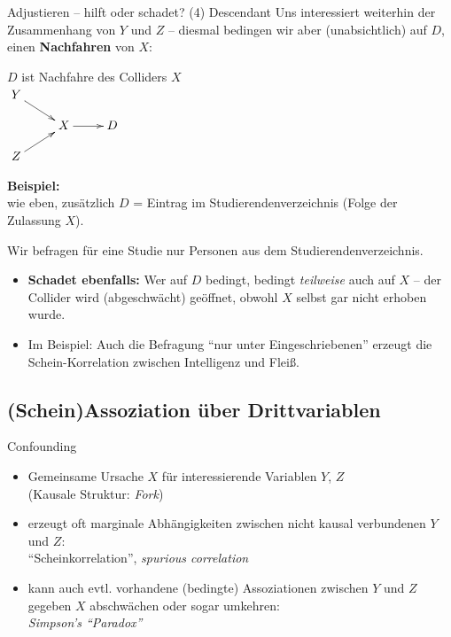 \documentclass[
  10pt,
  ignorenonframetext,
]{beamer}
\providecommand{\tightlist}{%
  \setlength{\itemsep}{0pt}\setlength{\parskip}{0pt}}
\begin{document}
\begin{frame}{Adjustieren -- hilft oder schadet? (4) Descendant}
\protect\hypertarget{adjustieren-hilft-oder-schadet-4-descendant}{}
Uns interessiert weiterhin der Zusammenhang von \(Y\) und \(Z\) --
diesmal bedingen wir aber (unabsichtlich) auf \(D\), einen
\textbf{Nachfahren} von \(X\):

\columnsbegin
\column{4.2cm}
\begin{center}
$D$ ist Nachfahre des Colliders $X$\\[.3em]
$\xymatrix@R-1pc{
 Y \ar[dr] & \\
  & X \ar[r] & D \\
 Z \ar[ur] &
}$
\end{center}
\column{6.5cm}
\small

\textbf{Beispiel:}\\
wie eben, zusätzlich \(D\) = Eintrag im Studierendenverzeichnis (Folge
der Zulassung \(X\)).

Wir befragen für eine Studie nur Personen aus dem
Studierendenverzeichnis. \columnsend

\begin{itemize}[<+->]
\tightlist
\item
  \textbf{Schadet ebenfalls:} Wer auf \(D\) bedingt, bedingt
  \emph{teilweise} auch auf \(X\) -- der Collider wird (abgeschwächt)
  geöffnet, obwohl \(X\) selbst gar nicht erhoben wurde.
\item
  Im Beispiel: Auch die Befragung ``nur unter Eingeschriebenen'' erzeugt
  die Schein-Korrelation zwischen Intelligenz und Fleiß.
\end{itemize}
\end{frame}

\hypertarget{scheinassoziation-uxfcber-drittvariablen}{%
\subsection{(Schein)Assoziation über
Drittvariablen}\label{scheinassoziation-uxfcber-drittvariablen}}

\begin{frame}{Confounding}
\protect\hypertarget{confounding}{}
\begin{itemize}
\item
  Gemeinsame Ursache \(X\) für interessierende Variablen \(Y\), \(Z\)\\
  (Kausale Struktur: \emph{Fork})
\item
  erzeugt oft marginale Abhängigkeiten zwischen nicht kausal verbundenen
  \(Y\) und \(Z\):\\
  ``Scheinkorrelation'', \emph{spurious correlation}
\item
  kann auch evtl. vorhandene (bedingte) Assoziationen zwischen \(Y\) und
  \(Z\) gegeben \(X\) abschwächen oder sogar umkehren:\\
  \emph{Simpson's ``Paradox''}
\end{itemize}
\end{frame}
\end{document}
